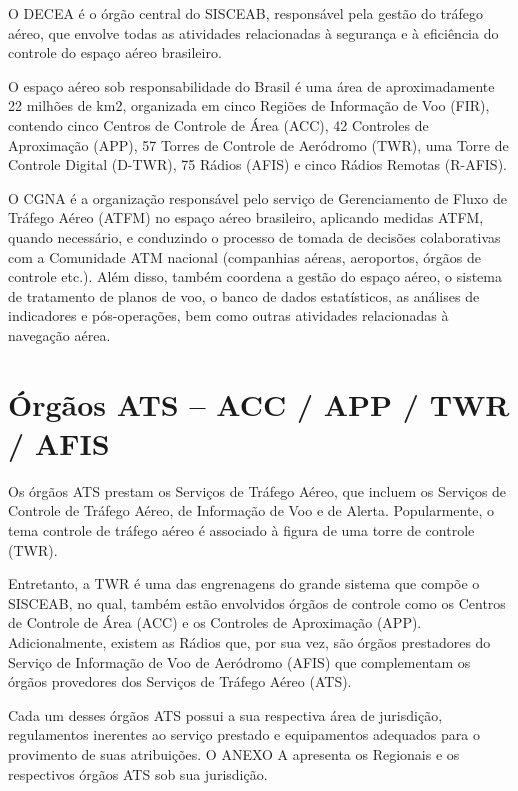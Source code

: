 \documentclass[
]{book}
\theoremstyle{definition}
\theoremstyle{definition}
\theoremstyle{definition}
\theoremstyle{definition}
\theoremstyle{remark}
\begin{document}
O DECEA é o órgão central do SISCEAB, responsável pela gestão do tráfego aéreo, que envolve todas as atividades relacionadas à segurança e à eficiência do controle do espaço aéreo brasileiro.

O espaço aéreo sob responsabilidade do Brasil é uma área de aproximadamente 22 milhões de km2, organizada em cinco Regiões de Informação de Voo (FIR), contendo cinco Centros de Controle de Área (ACC), 42 Controles de Aproximação (APP), 57 Torres de Controle de Aeródromo (TWR), uma Torre de Controle Digital (D-TWR), 75 Rádios (AFIS) e cinco Rádios Remotas (R-AFIS).

O CGNA é a organização responsável pelo serviço de Gerenciamento de Fluxo de Tráfego Aéreo (ATFM) no espaço aéreo brasileiro, aplicando medidas ATFM, quando necessário, e conduzindo o processo de tomada de decisões colaborativas com a Comunidade ATM nacional (companhias aéreas, aeroportos, órgãos de controle etc.). Além disso, também coordena a gestão do espaço aéreo, o sistema de tratamento de planos de voo, o banco de dados estatísticos, as análises de indicadores e pós-operações, bem como outras atividades relacionadas à navegação aérea.

\hypertarget{uxf3rguxe3os-ats-acc-app-twr-afis}{%
\section{Órgãos ATS -- ACC / APP / TWR / AFIS}\label{uxf3rguxe3os-ats-acc-app-twr-afis}}

Os órgãos ATS prestam os Serviços de Tráfego Aéreo, que incluem os Serviços de Controle de Tráfego Aéreo, de Informação de Voo e de Alerta.
Popularmente, o tema controle de tráfego aéreo é associado à figura de uma torre de controle (TWR).

Entretanto, a TWR é uma das engrenagens do grande sistema que compõe o SISCEAB, no qual, também estão envolvidos órgãos de controle como os Centros de Controle de Área (ACC) e os Controles de Aproximação (APP). Adicionalmente, existem as Rádios que, por sua vez, são órgãos prestadores do Serviço de Informação de Voo de Aeródromo (AFIS) que complementam os órgãos provedores dos Serviços de Tráfego Aéreo (ATS).

Cada um desses órgãos ATS possui a sua respectiva área de jurisdição, regulamentos inerentes ao serviço prestado e equipamentos adequados para o provimento de suas atribuições. O ANEXO A apresenta os Regionais e os respectivos órgãos ATS sob sua jurisdição.
\end{document}
